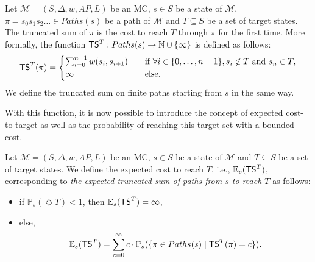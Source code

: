 \begin{definition}
  Let $\mathcal{M}=(S, \Delta, w, AP, L)$ be an MC, $s \in S$ be a state of $\mathcal{M}$, $\pi = s_0s_1s_2\dots \in Paths(s)$ be a path of $\mathcal{M}$ and $T \subseteq S$ be a set of target states.
  The truncated sum of $\pi$ is the cost to reach $T$ through $\pi$
  for the first time. More formally, the function $\text{\sffamily TS}^T: Paths(s) \rightarrow \mathbb{N} \cup \{\infty\}$ is defined as follows:
	\[
		\text{\sffamily TS}^T(\pi) =
		\begin{cases}
			\sum_{i = 0}^{n-1} w(s_i, s_{i+1}) & \quad \text{if } \forall i \in \{0, \dots, n - 1\}, s_i \not\in T \text{ and } s_n \in T, \\
			\infty & \quad \text{else.}
		\end{cases}
	\]
  We define the truncated sum on finite paths starting from $s$ in the same way.
\end{definition}
With this function, it is now possible to introduce the concept of
expected cost-to-target as well as
the probability of reaching this target set with a bounded cost.

\begin{definition}
	Let $\mathcal{M} = (S, \Delta, w, AP, L)$ be an MC, $s \in S$ be a state of $\mathcal{M}$ and $T \subseteq S$ be a set of target states. We define the expected cost to reach $T$, i.e., $\mathbb{E}_s(\text{\sffamily TS}^T)$, corresponding to \textit{the expected truncated sum of paths from $s$ to reach $T$} as follows:
	\begin{itemize}
	\renewcommand{\labelitemi}{\tiny$\bullet$}
	\item if $\mathbb{P}_s(\Diamond T) < 1$, then $\mathbb{E}_s(\text{\sffamily TS}^T) = \infty$,%
	\item else,
	\[
    \mathbb{E}_s(\text{\sffamily TS}^T) = \sum_{c = 0}^\infty c \cdot \mathbb{P}_s(\{\pi \in Paths(s) \; | \; \text{\sffamily TS}^T(\pi) = c \}).
  \]
	\end{itemize}
\end{definition}

